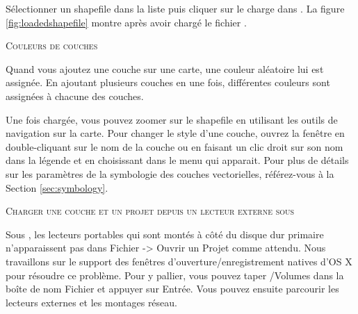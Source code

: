 Sélectionner un shapefile dans la liste puis cliquer sur  le 
charge dans \qg. La figure \ref{fig:loadedshapefile} montre \qg après avoir 
chargé le fichier .

\begin{Tip}\caption{\textsc{Couleurs de couches}}
Quand vous ajoutez une couche sur une carte, une couleur aléatoire lui est 
assignée. En ajoutant plusieurs couches en une fois, différentes couleurs 
sont assignées à chacune des couches.
\end{Tip}

Une fois chargée, vous pouvez zoomer sur le shapefile en utilisant les 
outils de navigation sur la carte.
Pour changer le style d'une couche, ouvrez la fenêtre 
 en double-cliquant sur le nom de la couche 
ou en faisant un clic droit sur son nom dans la légende et en choisissant 
 dans le menu qui apparait. Pour plus de détails 
sur les paramètres de la symbologie des couches vectorielles, référez-vous 
à la Section \ref{sec:symbology}.

\begin{Tip}\caption{\textsc{Charger une couche et un projet depuis un lecteur 
externe sous \mac}}
Sous \mac, les lecteurs portables qui sont montés à côté du disque dur primaire 
n'apparaissent pas dans Fichier -> Ouvrir un Projet comme attendu. Nous 
travaillons sur le support des fenêtres d'ouverture/enregistrement natives 
d'OS X pour résoudre ce problème. Pour y pallier, vous pouvez taper /Volumes 
dans la boîte de nom Fichier et appuyer sur Entrée. Vous pouvez ensuite 
parcourir les lecteurs externes et les montages réseau.
\end{Tip}

